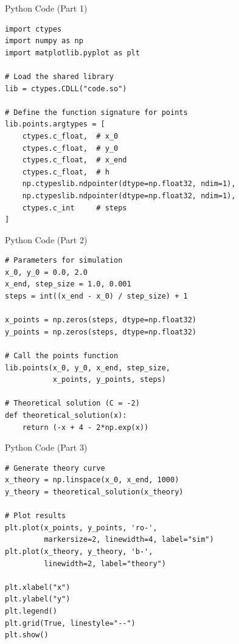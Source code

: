 \documentclass{beamer}
\begin{document}
\begin{frame}[fragile]{Python Code (Part 1)}
\lstset{language=Python}
\begin{lstlisting}
import ctypes
import numpy as np
import matplotlib.pyplot as plt

# Load the shared library
lib = ctypes.CDLL("code.so")

# Define the function signature for points
lib.points.argtypes = [
    ctypes.c_float,  # x_0
    ctypes.c_float,  # y_0
    ctypes.c_float,  # x_end
    ctypes.c_float,  # h
    np.ctypeslib.ndpointer(dtype=np.float32, ndim=1),  
    np.ctypeslib.ndpointer(dtype=np.float32, ndim=1),  
    ctypes.c_int     # steps
]
\end{lstlisting}
\end{frame}

\begin{frame}[fragile]{Python Code (Part 2)}
\lstset{language=Python}
\begin{lstlisting}
# Parameters for simulation
x_0, y_0 = 0.0, 2.0
x_end, step_size = 1.0, 0.001
steps = int((x_end - x_0) / step_size) + 1

x_points = np.zeros(steps, dtype=np.float32)
y_points = np.zeros(steps, dtype=np.float32)

# Call the points function
lib.points(x_0, y_0, x_end, step_size, 
           x_points, y_points, steps)

# Theoretical solution (C = -2)
def theoretical_solution(x):
    return (-x + 4 - 2*np.exp(x))
\end{lstlisting}
\end{frame}

\begin{frame}[fragile]{Python Code (Part 3)}
\lstset{language=Python}
\begin{lstlisting}
# Generate theory curve
x_theory = np.linspace(x_0, x_end, 1000)
y_theory = theoretical_solution(x_theory)

# Plot results
plt.plot(x_points, y_points, 'ro-', 
         markersize=2, linewidth=4, label="sim")
plt.plot(x_theory, y_theory, 'b-', 
         linewidth=2, label="theory")

plt.xlabel("x")
plt.ylabel("y")
plt.legend()
plt.grid(True, linestyle="--")
plt.show()
\end{lstlisting}
\end{frame}
\end{document}
